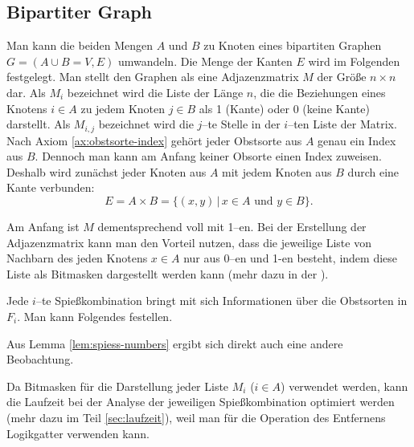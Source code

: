 \subsection{Bipartiter Graph}
Man kann die beiden Mengen $A$ und $B$ zu Knoten eines bipartiten Graphen $G = (A \cup B = V, E)$ umwandeln.
Die Menge der Kanten $E$ wird im Folgenden festgelegt.
Man stellt den Graphen als eine Adjazenzmatrix $M$ der Größe $n \times n$ dar. 
Als $M_i$ bezeichnet wird die Liste der Länge $n$,
die die Beziehungen eines Knotens
$i \in A$ zu jedem Knoten $j \in B$ als 1 (Kante) oder 0 (keine Kante) darstellt.
Als $M_{i, j}$ bezeichnet wird die $j$--te Stelle in der $i$--ten Liste der Matrix.\\
Nach Axiom \ref{ax:obstsorte-index} gehört jeder Obstsorte aus $A$ genau ein Index aus $B$.
Dennoch man kann am Anfang keiner Obsorte einen Index zuweisen.
Deshalb wird zunächst jeder Knoten aus $A$ mit jedem Knoten aus $B$ durch eine Kante verbunden:
\[
E = A\times B = \{(x, y) \,|\,  x \in A \text{ und } y \in B\}.
\]

Am Anfang ist $M$ dementsprechend voll mit 1--en.
Bei der Erstellung der Adjazenzmatrix kann man den Vorteil nutzen, dass die jeweilige 
Liste von Nachbarn des jeden Knotens $x \in A$ nur aus 0--en und 1-en besteht, indem
 diese Liste als Bitmasken dargestellt werden kann (mehr dazu in der ).



Jede $i$--te Spießkombination bringt mit sich Informationen über die Obstsorten in $F_i$.
Man kann Folgendes festellen. 



\noindent Aus Lemma \ref{lem:spiess-numbers} ergibt sich direkt auch eine andere Beobachtung.



Da Bitmasken für die Darstellung jeder Liste $M_i$ ($i \in A$) verwendet werden, kann
die Laufzeit bei der Analyse der jeweiligen Spießkombination optimiert werden
(mehr dazu im Teil \ref{sec:laufzeit}),
weil man für die Operation des Entfernens Logikgatter verwenden kann.
